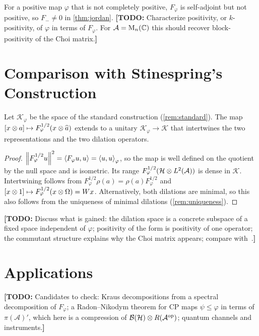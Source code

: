 \documentclass[12pt]{article}
\newcommand{\todo}[1]{\textcolor{\mysubcolor}{\small\textbf{[TODO:} #1\textbf{]}}}
\newcommand{\alg}{\mathcal{A}}             %
\newcommand{\hilb}{\mathcal{H}}            %
\newcommand{\dil}{\mathcal{K}}             %
\newcommand{\bdd}[1]{\mathcal{B}\br{#1}}   %
\newcommand{\op}{^{\mathrm{op}}}           %
\newcommand{\ip}[2]{\left\langle #1 , #2 \right\rangle}
\newcommand{\ipphi}[2]{\left\langle #1 , #2 \right\rangle_{\varphi}}
\newcommand{\Ltwo}{L^2\br{\alg}}           %
\newcommand{\vect}[1]{\widehat{#1}}        %
\newcommand{\Ltn}{\hilb \tensor \Ltwo}     %
\newcommand{\Fphi}{F_{\varphi}}            %
\begin{document}
\begin{remark}
For a positive map \(\varphi\) that is not completely positive, \(\Fphi\) is
self-adjoint but not positive, so \(F_- \ne 0\) in \cref{thm:jordan}.
\todo{Characterize positivity, or \(k\)-positivity, of \(\varphi\) in terms of
\(\Fphi\). For \(\alg = \mathrm{M}_n(\complex)\) this should recover
block-positivity of the Choi matrix.}
\end{remark}

\section{Comparison with Stinespring's Construction}
\label{sec:comparison}

\begin{proposition}
\label{prop:comparison}
Let \(\dil_\varphi\) be the space of the standard construction
(\cref{rem:standard}). The map
\([x \tensor a] \mapsto \Fphi^{1/2}(x \tensor \vect{a})\) extends to a unitary
\(\dil_\varphi \to \dil\) that intertwines the two representations and the two
dilation operators.
\end{proposition}
\begin{proof}
\(\norm{\Fphi^{1/2}u}^2 = \ip{\Fphi u}{u} = \ipphi{u}{u}\), so the map is well
defined on the quotient by the null space and is isometric. Its range
\(\Fphi^{1/2}(\Ltn)\) is dense in \(\dil\). Intertwining follows from
\(\Fphi^{1/2}\rho(a) = \rho(a)\Fphi^{1/2}\) and
\([x \tensor 1] \mapsto \Fphi^{1/2}(x \tensor \Omega) = Wx\).
Alternatively, both dilations are minimal, so this also follows from the
uniqueness of minimal dilations (\cref{rem:uniqueness}).
\end{proof}

\todo{Discuss what is gained: the dilation space is a concrete subspace of a fixed
space independent of \(\varphi\); positivity of the form is positivity of one
operator; the commutant structure explains why the Choi matrix appears; compare
with~\cite{Kasparov1980,Arveson1969,Paulsen2002}.}

\section{Applications}
\label{sec:applications}

\todo{Candidates to check: Kraus decompositions from a spectral decomposition of
\(\Fphi\); a Radon--Nikodym theorem for CP maps \(\psi \le \varphi\) in terms of
\(\pi(\alg)'\), which here is a compression of \(\bdd{\hilb} \tensor R(\alg\op)\);
quantum channels and instruments.}
\end{document}
